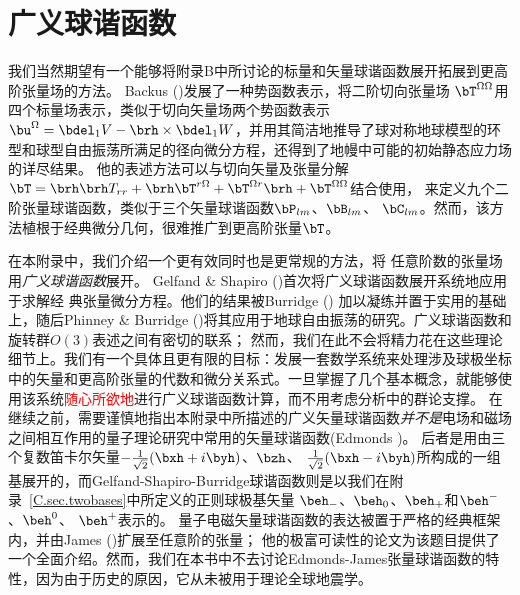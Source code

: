 \chapter{广义球谐函数}
\label{chapter:gsh}

我们当然期望有一个能够将附录B中所讨论的标量和矢量球谐函数展开拓展到更高阶张量场的方法。
%
%
Backus (\citeyear{backus67})发展了一种势函数表示，将二阶切向张量场 $\bT^{\Omega\Omega}$用四个标量场表示，类似于切向矢量场两个势函数表示
$\bu^{\Omega}=\bdel_1V-\brh\times\bdel_1W$，并用其简洁地推导了球对称地球模型的环型和球型自由振荡所满足的径向微分方程，还得到了地幔中可能的初始静态应力场的详尽结果。
他的表述方法可以与切向矢量及张量分解$\bT=\brh\brh T_{rr}
+\brh\bT^{r\Omega}+\bT^{\Omega r}\brh+\bT^{\Omega\Omega}$结合使用，
来定义九个二阶张量球谐函数，类似于三个矢量球谐函数$\bP_{lm}$、$\bB_{lm}$、 $\bC_{lm}$。然而，该方法植根于经典微分几何，很难推广到更高阶张量$\bT$。

\enlargethispage{-0.5\baselineskip}
在本附录中，我们介绍一个更有效同时也是更常规的方法，将
任意阶数的张量场用{\em 广义球谐函数\/}展开。
%
%
Gelfand \& Shapiro
(\citeyear{gelfand&shapiro56})首次将广义球谐函数展开系统地应用于求解经
典张量微分方程。他们的结果被Burridge (\citeyear{burridge69}) 加以凝练并置于实用的基础上，随后Phinney \& Burridge (\citeyear{phinney&burridge73})将其应用于地球自由振荡的研究。广义球谐函数和旋转群$O(3)$表述之间有密切的联系； 然而，我们在此不会将精力花在这些理论细节上。我们有一个具体且更有限的目标：发展一套数学系统来处理涉及球极坐标中的矢量和更高阶张量的代数和微分关系式。一旦掌握了几个基本概念，就能够使用该系统\textcolor{red}{随心所欲地}进行广义球谐函数计算，而不用考虑分析中的群论支撑。
在继续之前，需要谨慎地指出本附录中所描述的广义矢量球谐函数{\em 并不是\/}电场和磁场之间相互作用的量子理论研究中常用的矢量球谐函数(Edmonds \citeyear{edmonds60})。
后者是用由三个复数笛卡尔矢量$-\frac{1}{\sqrt{2}}(\bxh+i\byh)$、$\bzh$、\vspace{-0.4 mm}
$\frac{1}{\sqrt{2}}(\bxh-i\byh)$所构成的一组基展开的，而Gelfand-Shapiro-Burridge球谐函数则是以我们在附录~\ref{C.sec.twobases}中所定义的正则球极基矢量
$\beh_-$、$\beh_0$、$\beh_+$和$\beh^-$、$\beh^0$、
$\beh^+$表示的。
量子电磁矢量球谐函数的表达被置于严格的经典框架内，并由James (\citeyear{james76})扩展至任意阶的张量；
他的极富可读性的论文为该题目提供了一个全面介绍。然而，我们在本书中不去讨论Edmonds-James张量球谐函数的特性，因为由于历史的原因，它从未被用于理论全球地震学。

